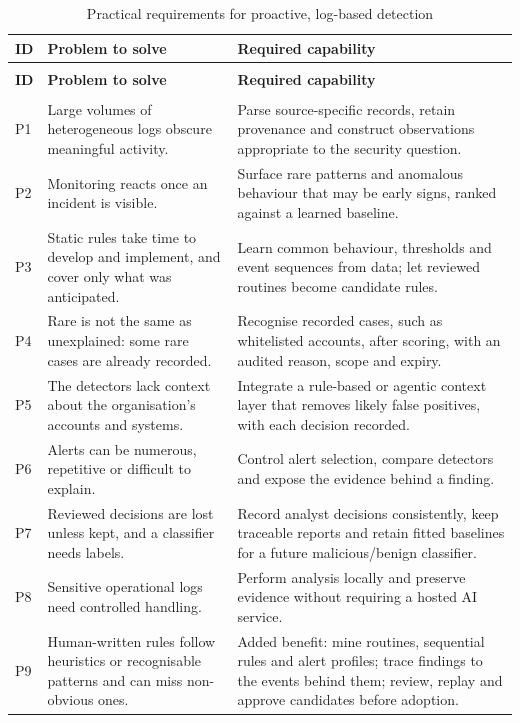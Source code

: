 \documentclass[11pt,a4paper]{article}
\begin{document}
\begingroup
\small
\begin{longtable}{>{\RaggedRight\arraybackslash}p{}>{\RaggedRight\arraybackslash}p{}>{\RaggedRight\arraybackslash}p{}}
\caption{Practical requirements for proactive, log-based detection}\label{tab:1}\\
\toprule
\rowcolor{pale} \textbf{ID} & \textbf{Problem to solve} & \textbf{Required capability} \\
\midrule
\endfirsthead
\multicolumn{3}{l}{\small\itshape Table \thetable{} --- continued}\\
\toprule
\rowcolor{pale} \textbf{ID} & \textbf{Problem to solve} & \textbf{Required capability} \\
\midrule
\endhead
\midrule
\multicolumn{3}{r}{\footnotesize Continued on the next page}\\
\endfoot
\bottomrule
\endlastfoot
P1 & Large volumes of heterogeneous logs obscure meaningful activity. & Parse source-specific records, retain provenance and construct observations appropriate to the security question. \\[3pt]
P2 & Monitoring reacts once an incident is visible. & Surface rare patterns and anomalous behaviour that may be early signs, ranked against a learned baseline. \\[3pt]
P3 & Static rules take time to develop and implement, and cover only what was anticipated. & Learn common behaviour, thresholds and event sequences from data; let reviewed routines become candidate rules. \\[3pt]
P4 & Rare is not the same as unexplained: some rare cases are already recorded. & Recognise recorded cases, such as whitelisted accounts, after scoring, with an audited reason, scope and expiry. \\[3pt]
P5 & The detectors lack context about the organisation's accounts and systems. & Integrate a rule-based or agentic context layer that removes likely false positives, with each decision recorded. \\[3pt]
P6 & Alerts can be numerous, repetitive or difficult to explain. & Control alert selection, compare detectors and expose the evidence behind a finding. \\[3pt]
P7 & Reviewed decisions are lost unless kept, and a classifier needs labels. & Record analyst decisions consistently, keep traceable reports and retain fitted baselines for a future malicious/benign classifier. \\[3pt]
P8 & Sensitive operational logs need controlled handling. & Perform analysis locally and preserve evidence without requiring a hosted AI service. \\[3pt]
P9 & Human-written rules follow heuristics or recognisable patterns and can miss non-obvious ones. & Added benefit: mine routines, sequential rules and alert profiles; trace findings to the events behind them; review, replay and approve candidates before adoption. \\[3pt]
\end{longtable}
\endgroup
\end{document}
